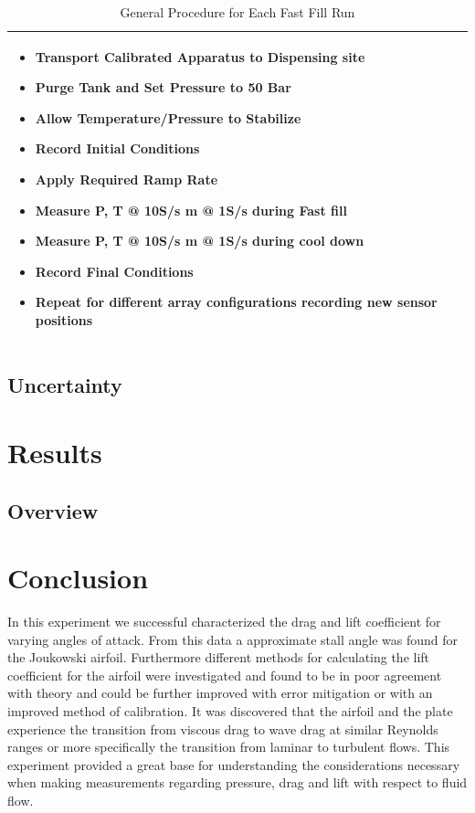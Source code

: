 \documentclass[paper=a4, fontsize=11pt, abstract=on]{scrartcl}
\numberwithin{equation}{section}		%
\numberwithin{figure}{section}			%
\numberwithin{table}{section}				%
\begin{document}
\begin{table}[H]
\begin{center}
    \begin{tabular}{ | p{1.00\linewidth} |}
 \hline  
    \begin{itemize}
\item Transport Calibrated Apparatus to Dispensing site
\item Purge Tank and Set Pressure to 50 Bar
\item Allow Temperature/Pressure to Stabilize 
\item Record Initial Conditions
\item Apply Required Ramp Rate
\item Measure P, T @ 10S/s  m @ 1S/s during Fast fill
\item Measure P, T @ 10S/s  m @ 1S/s during cool down
\item Record Final Conditions
\item Repeat for different array configurations recording new sensor positions
\end{itemize}
    \\ \hline  

    \end{tabular}
\end{center} 
\caption{General Procedure for Each Fast Fill Run}
\label{pro} 
\end{table}
 
\subsection{Uncertainty} 


\newpage 
   
\section{Results}

\subsection{Overview}


\section{Conclusion}
In this experiment we successful characterized the drag and lift coefficient for varying angles of attack. From this data a approximate stall angle was found for the Joukowski airfoil. Furthermore different methods for calculating the lift coefficient for the airfoil were investigated and found to be in poor agreement with theory and could be further improved with error mitigation or with an improved method of calibration. It was discovered that the airfoil and the plate experience the transition from viscous drag to wave drag at similar Reynolds ranges or more specifically the transition from laminar to turbulent flows. This experiment provided a great base for understanding the considerations necessary when making measurements regarding pressure, drag and lift with respect to fluid flow.
\end{document}
